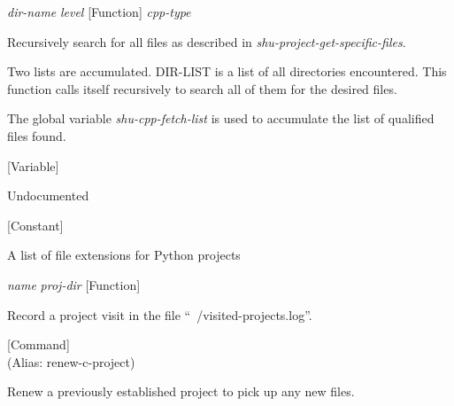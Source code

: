 \vspace{1em}
\noindent
{}
\usebox{\funcname}\emph{dir-name} \emph{level}
 \hfill [Function]
\hspace*{\wd\funcname}\emph{cpp-type}

\begin{doc-string}
Recursively search for all files as described in
\emph{shu-project-get-specific-files}.

Two lists are accumulated.  DIR-LIST is a list of all directories encountered.
This function calls itself recursively to search all of them for the desired
files.

The global variable \emph{shu-cpp-fetch-list} is used to accumulate the list of
qualified files found.
\end{doc-string}

\vspace{1em}
\noindent
{}
\usebox{\funcname}
 \hfill [Variable]

\begin{doc-string}
Undocumented
\end{doc-string}

\vspace{1em}
\noindent
{}
\usebox{\funcname}
 \hfill [Constant]

\begin{doc-string}
A list of file extensions for Python projects
\end{doc-string}

\vspace{1em}
\noindent
{}
\usebox{\funcname}\emph{name} \emph{proj-dir}
 \hfill [Function]

\begin{doc-string}
Record a project visit in the file ``~/visited-projects.log''.
\end{doc-string}

\vspace{1em}
\noindent
{}
\usebox{\funcname}
 \hfill [Command]\\%
 (Alias: renew-c-project)

\begin{doc-string}
Renew a previously established project to pick up any new files.
\end{doc-string}


